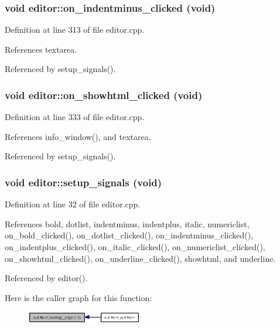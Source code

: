 \subsubsection{\setlength{\rightskip}{0pt plus 5cm}void editor::on\_\-indentminus\_\-clicked (void)\hspace{0.3cm}{\tt  [private, slot]}}\label{classeditor_352da706a98d5d7534c6ed588a7b93f8}




Definition at line 313 of file editor.cpp.

References textarea.

Referenced by setup\_\-signals().
\subsubsection{\setlength{\rightskip}{0pt plus 5cm}void editor::on\_\-showhtml\_\-clicked (void)\hspace{0.3cm}{\tt  [private, slot]}}\label{classeditor_767295f5130a950cdc31aa98745edcf3}




Definition at line 333 of file editor.cpp.

References info\_\-window(), and textarea.

Referenced by setup\_\-signals().
\subsubsection{\setlength{\rightskip}{0pt plus 5cm}void editor::setup\_\-signals (void)\hspace{0.3cm}{\tt  [private]}}\label{classeditor_edcd49dcab7abf1cef20b89e5a3442b5}




Definition at line 32 of file editor.cpp.

References bold, dotlist, indentminus, indentplus, italic, numericlist, on\_\-bold\_\-clicked(), on\_\-dotlist\_\-clicked(), on\_\-indentminus\_\-clicked(), on\_\-indentplus\_\-clicked(), on\_\-italic\_\-clicked(), on\_\-numericlist\_\-clicked(), on\_\-showhtml\_\-clicked(), on\_\-underline\_\-clicked(), showhtml, and underline.

Referenced by editor().

Here is the caller graph for this function:\begin{figure}[H]
\begin{center}
\leavevmode
\includegraphics[width=143pt]{classeditor_edcd49dcab7abf1cef20b89e5a3442b5_icgraph}
\end{center}
\end{figure}
